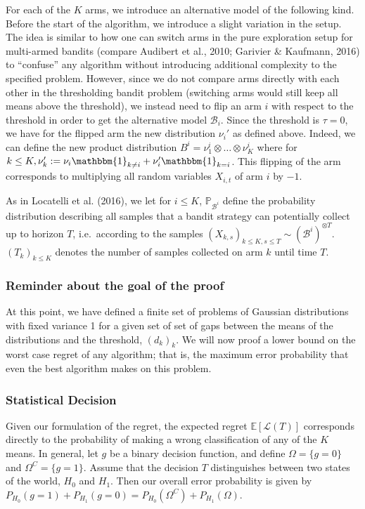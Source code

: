 \documentclass[12pt,]{article}
\begin{document}
For each of the \(K\) arms, we introduce an alternative model of the
following kind. Before the start of the algorithm, we introduce a slight
variation in the setup. The idea is similar to how one can switch arms
in the pure exploration setup for multi-armed bandits (compare Audibert
et al., 2010; Garivier \& Kaufmann, 2016) to ``confuse'' any algorithm
without introducing additional complexity to the specified problem.
However, since we do not compare arms directly with each other in the
thresholding bandit problem (switching arms would still keep all means
above the threshold), we instead need to flip an arm \(i\) with respect
to the threshold in order to get the alternative model
\(\mathcal{B}_i\). Since the threshold is \(\tau = 0\), we have for the
flipped arm the new distribution \(\nu_i'\) as defined above. Indeed, we
can define the new product distribution
\(B^i = \nu_1^i \otimes \dots \otimes \nu_K^i\) where for
\(k \leq K, \nu_k' := \nu_i \mathbbm{1}_{k \neq i} + \nu_i' \mathbbm{1}_{k=i}\).
This flipping of the arm corresponds to multiplying all random variables
\(X_{i,t}\) of arm \(i\) by \(-1\).

As in Locatelli et al. (2016), we let for \(i \leq K\),
\(\mathbb{P}_{\mathcal{B}^i}\) define the probability distribution
describing all samples that a bandit strategy can potentially collect up
to horizon \(T\), i.e.~according to the samples
\((X_{k,s})_{k\leq K, s \leq T} \sim (\mathcal{B}^i)^{\otimes T}\).
\((T_k)_{k\leq K}\) denotes the number of samples collected on arm \(k\)
until time \(T\).

\subsubsection{Reminder about the goal of the
proof}\label{reminder-about-the-goal-of-the-proof}

At this point, we have defined a finite set of problems of Gaussian
distributions with fixed variance 1 for a given set of set of gaps
between the means of the distributions and the threshold, \((d_k)_k\).
We will now proof a lower bound on the worst case regret of any
algorithm; that is, the maximum error probability that even the best
algorithm makes on this problem.

\subsubsection{Statistical Decision}\label{statistical-decision}

Given our formulation of the regret, the expected regret
\(\mathbb{E}[\mathcal{L}(T)]\) corresponds directly to the probability
of making a wrong classification of any of the \(K\) means. In general,
let \(g\) be a binary decision function, and define
\(\Omega = \{g = 0\}\) and \(\Omega^C = \{g = 1\}\). Assume that the
decision \(T\) distinguishes between two states of the world, \(H_0\)
and \(H_1\). Then our overall error probability is given by
\(P_{H_0}(g=1) + P_{H_1}(g = 0) = P_{H_0}(\Omega^C) + P_{H_1}(\Omega)\).
\end{document}
